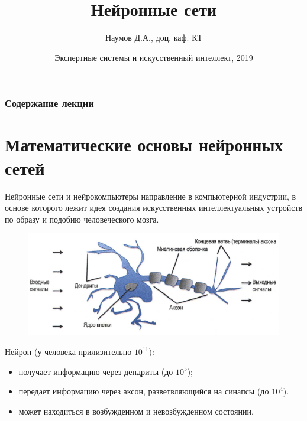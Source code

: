 \documentclass{beamer}
\title[Artifical Intelligence]{Нейронные сети}
\author{Наумов Д.А., доц. каф. КТ}
\date[11.02.2019] {Экспертные системы и искусственный интеллект, 2019}
\begin{document}
\begin{frame}
  \titlepage
\end{frame}
  
\begin{frame}
  \frametitle{Содержание лекции}
  \tableofcontents  
\end{frame}

\section{Математические основы нейронных сетей}

\begin{frame}[t]
	\begin{block}{Нейронные сети и нейрокомпьютеры}
		направление в компьютерной индустрии, в основе которого лежит идея создания искусственных интеллектуальных устройств по образу и подобию человеческого мозга.
	\end{block}
	\begin{figure}[h]
		\centering
		\includegraphics[scale=0.3]{images/lec03-pic01.png}
	\end{figure}
	Нейрон (у человека прилизительно $10^{11}$):
	\begin{itemize}
		\item получает информацию через дендриты (до $10^5$);
		\item передает информацию через аксон, разветвляющийся на синапсы (до $10^4$).
		\item может находиться в возбужденном и невозбужденном состоянии.		
	\end{itemize}
\end{frame}
	
\end{document}

